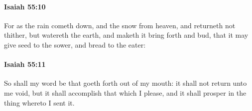 		\paragraph{Isaiah 55:10} %
			\label{ISAIAH-55-10}

			For as the rain cometh down, and the snow from heaven, and returneth not thither, but watereth the earth, and maketh it bring forth and bud, that it may give seed to the sower, and bread to the eater:


		\paragraph{Isaiah 55:11} %
			\label{ISAIAH-55-11}

			So shall my word be that goeth forth out of my mouth: it shall not return unto me void, but it shall accomplish that which I please, and it shall prosper in the thing whereto I sent it.

